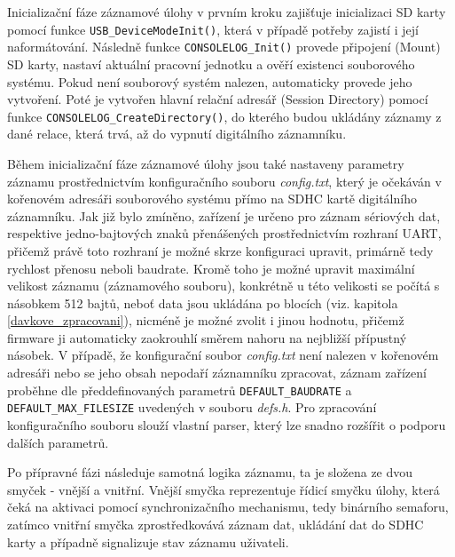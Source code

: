Inicializační fáze záznamové úlohy v prvním kroku zajišťuje inicializaci SD karty pomocí funkce \texttt{USB\_DeviceModeInit()}, která v případě potřeby zajistí i její naformátování. Následně funkce \texttt{CONSOLELOG\_Init()} provede připojení (Mount) SD karty, nastaví aktuální pracovní jednotku a ověří existenci souborového systému. Pokud není souborový systém nalezen, automaticky provede jeho vytvoření. Poté je vytvořen hlavní relační adresář (Session Directory) pomocí funkce \texttt{CONSOLELOG\_CreateDirectory()}, do kterého budou ukládány záznamy z dané relace, která trvá, až do vypnutí digitálního záznamníku.


Během inicializační fáze záznamové úlohy jsou také nastaveny parametry záznamu prostřednictvím konfiguračního souboru \textit{config.txt}, který je očekáván v kořenovém adresáři souborového systému přímo na SDHC kartě digitálního záznamníku. Jak již bylo zmíněno, zařízení je určeno pro záznam sériových dat, respektive jedno-bajtových znaků přenášených prostřednictvím rozhraní UART, přičemž právě toto rozhraní je možné skrze konfiguraci upravit, primárně tedy rychlost přenosu neboli baudrate. Kromě toho je možné upravit maximální velikost záznamu (záznamového souboru), konkrétně u této velikosti se počítá s násobkem 512 bajtů, neboť data jsou ukládána po blocích (viz. kapitola \ref{davkove_zpracovani}), nicméně je možné zvolit i jinou hodnotu, přičemž firmware ji automaticky zaokrouhlí směrem nahoru na nejbližší přípustný násobek. V případě, že konfigurační soubor \textit{config.txt} není nalezen v kořenovém adresáři nebo se jeho obsah nepodaří záznamníku zpracovat, záznam zařízení proběhne dle předdefinovaných parametrů \texttt{DEFAULT\_BAUDRATE} a \texttt{DEFAULT\_MAX\_FILESIZE} uvedených v souboru \textit{defs.h}. Pro zpracování konfiguračního souboru slouží vlastní parser, který lze snadno rozšířit o podporu dalších parametrů.

Po přípravné fázi následuje samotná logika záznamu, ta je složena ze dvou smyček - vnější a vnitřní. Vnější smyčka reprezentuje řídicí smyčku úlohy, která čeká na aktivaci pomocí synchronizačního mechanismu, tedy binárního semaforu, zatímco vnitřní smyčka zprostředkovává záznam dat, ukládání dat do SDHC karty a případně signalizuje stav záznamu uživateli.

